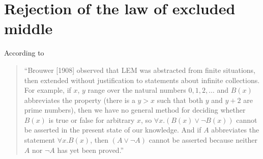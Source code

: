 \section{Rejection of the law of excluded middle}
According to \cite{stanfordLogic} 
\begin{quote}
``Brouwer [1908] observed that LEM was abstracted from finite situations, then extended without justification to statements about infinite collections. For example, if $x$, $y$ range over the natural numbers $0, 1, 2, \ldots$ and $B(x)$ abbreviates the property (there is a $y > x$ such that both $y$ and $y+2$ are prime numbers), then we have no general method for deciding whether $B(x)$ is true or false for arbitrary $x$, so $\forall x . (B(x) \vee \neg B(x))$ cannot be asserted in the present state of our knowledge. And if $A$ abbreviates the statement $\forall x . B(x)$, then $(A \vee \neg A)$ cannot be asserted because neither $A$ nor $\neg A$ has yet been proved.''
\end{quote}
